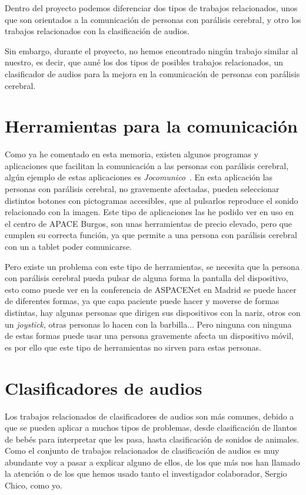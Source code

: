 
Dentro del proyecto podemos diferenciar dos tipos de trabajos relacionados, unos que son orientados a la comunicación de personas con parálisis cerebral, y otro los trabajos relacionados con la clasificación de audios.

Sin embargo, durante el proyecto, no hemos encontrado ningún trabajo similar al nuestro, es decir, que auné los dos tipos de posibles trabajos relacionados, un clasificador de audios para la mejora en la comunicación de personas con parálisis cerebral.

\section{Herramientas para la comunicación}
Como ya he comentado en esta memoria, existen algunos programas y aplicaciones que facilitan la comunicación a las personas con parálisis cerebral, algún ejemplo de estas aplicaciones es \textit{Jocomunico}~\cite{jocomunico}. En esta aplicación las personas con parálisis cerebral, no gravemente afectadas, pueden seleccionar distintos botones con pictogramas accesibles, que al pulsarlos reproduce el sonido relacionado con la imagen. Este tipo de aplicaciones las he podido ver en uso en el centro de APACE Burgos, son unas herramientas de precio elevado, pero que cumplen su correcta función, ya que permite a una persona con parálisis cerebral con un a tablet poder comunicarse.

Pero existe un problema con este tipo de herramientas, se necesita que la persona con parálisis cerebral pueda pulsar de alguna forma la pantalla del dispositivo, esto como puede ver en la conferencia de ASPACENet en Madrid se puede hacer de diferentes formas, ya que capa paciente puede hacer y moverse de formas distintas, hay algunas personas que dirigen sus dispositivos con la nariz, otros con un \textit{joystick}, otras personas lo hacen con la barbilla... Pero ninguna con ninguna de estas formas puede usar una persona gravemente afecta un dispositivo móvil, es por ello que este tipo de herramientas no sirven para estas personas.

\section{Clasificadores de audios}
Los trabajos relacionados de clasificadores de audios son más comunes, debido a que se pueden aplicar a muchos tipos de problemas, desde clasificación de llantos de bebés para interpretar que les pasa, hasta clasificación de sonidos de animales. Como el conjunto de trabajos relacionados de clasificación de audios es muy abundante voy a pasar a explicar alguno de ellos, de los que más nos han llamado la atención o de los que hemos usado tanto el investigador colaborador, Sergio Chico, como yo.

